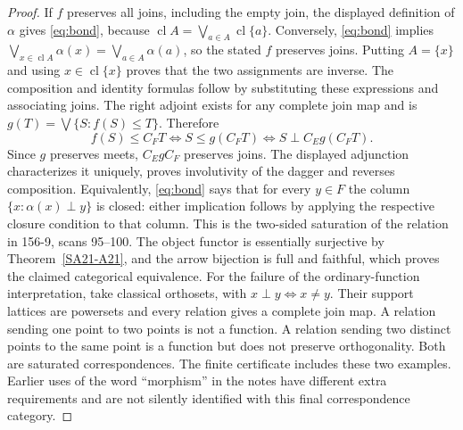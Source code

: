 \begin{proof}
If $f$ preserves all joins, including the empty join, the displayed
definition of $\alpha$ gives \eqref{eq:bond}, because
$\operatorname{cl}A=\bigvee_{a\in A}\operatorname{cl}\{a\}$.
Conversely, \eqref{eq:bond} implies
$\bigvee_{x\in\operatorname{cl}A}\alpha(x)=
\bigvee_{a\in A}\alpha(a)$, so the stated $f$ preserves joins.
Putting $A=\{x\}$ and using $x\in\operatorname{cl}\{x\}$ proves
that the two assignments are inverse. The composition and identity
formulas follow by substituting these expressions and associating
joins.
The right adjoint exists for any complete join map and is
$g(T)=\bigvee\{S:f(S)\leq T\}$. Therefore
\[
 f(S)\leq C_FT\iff S\leq g(C_FT)
       \iff S\perp C_Eg(C_FT).
\]
Since $g$ preserves meets, $C_EgC_F$ preserves joins. The displayed
adjunction characterizes it uniquely, proves involutivity of the
dagger and reverses composition. Equivalently,
\eqref{eq:bond} says that for every $y\in F$ the column
$\{x:\alpha(x)\perp y\}$ is closed: either implication follows
by applying the respective closure condition to that column.
This is the two-sided saturation of the relation in 156-9,
scans 95--100. The object functor is essentially surjective by
Theorem~\ref{SA21-A21}, and the arrow bijection is full and faithful,
which proves the claimed categorical equivalence.
For the failure of the ordinary-function interpretation, take
classical orthosets, with $x\perp y\iff x\ne y$.
Their support lattices are powersets and every relation gives a
complete join map. A relation sending one point to two points is
not a function. A relation sending two distinct points to the same
point is a function but does not preserve orthogonality. Both are
saturated correspondences. The finite certificate includes these
two examples. Earlier uses of the word ``morphism'' in the notes
have different extra requirements and are not silently identified
with this final correspondence category.
\end{proof}

